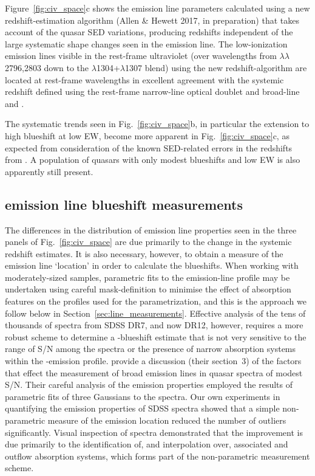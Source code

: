 Figure~\ref{fig:civ_space}c shows the  emission line parameters calculated using a new redshift-estimation algorithm (Allen \& Hewett 2017, in preparation) that takes account of the quasar SED variations, producing redshifts independent of the large systematic shape changes seen in the  emission line. 
The low-ionization emission lines visible in the rest-frame ultraviolet (over wavelengths from $\lambda\lambda$2796,2803 down to the $\lambda$1304+$\lambda$1307 blend) using the new redshift-algorithm are located at rest-frame wavelengths in excellent agreement with the systemic redshift defined using the rest-frame narrow-line optical  doublet and broad-line \hb and \hans.

The systematic trends seen in Fig.~\ref{fig:civ_space}b, in particular the extension to high blueshift at low  EW, become more apparent in Fig.~\ref{fig:civ_space}c, as expected from consideration of the known SED-related errors in the redshifts from \citet{hewett10}.
A population of quasars with only modest blueshifts and low EW is also apparently still present. 

\subsection{ emission line blueshift measurements}
\label{sec:civmeasure}

The differences in the distribution of  emission line properties seen in the three panels of Fig.~\ref{fig:civ_space} are due primarily to the change in the systemic redshift estimates. 
It is also necessary, however, to obtain a measure of the  emission line `location' in order to calculate the blueshifts. 
When working with moderately-sized samples, parametric fits to the emission-line profile may be undertaken using careful mask-definition to minimise the effect of absorption features on the profiles used for the parametrization, and this is the approach we follow below in Section~\ref{sec:line_measurements}. 
Effective analysis of the tens of thousands of spectra from SDSS DR7, and now DR12, however, requires a more robust scheme to determine a -blueshift estimate that is not very sensitive to the range of S/N among the spectra or the presence of narrow absorption systems within the -emission profile. 
\citet{shen11} provide a discussion (their section~3) of the factors that effect the measurement of broad emission lines in quasar spectra of modest S/N. 
Their careful analysis of the  emission properties employed the results of parametric fits of three Gaussians to the spectra. 
Our own experiments in quantifying the  emission properties of SDSS spectra showed that a simple non-parametric measure of the  emission location reduced the number of outliers significantly. 
Visual inspection of spectra demonstrated that the improvement is due primarily to the identification of, and interpolation over, associated and outflow absorption systems, which forms part of the non-parametric measurement scheme. 

